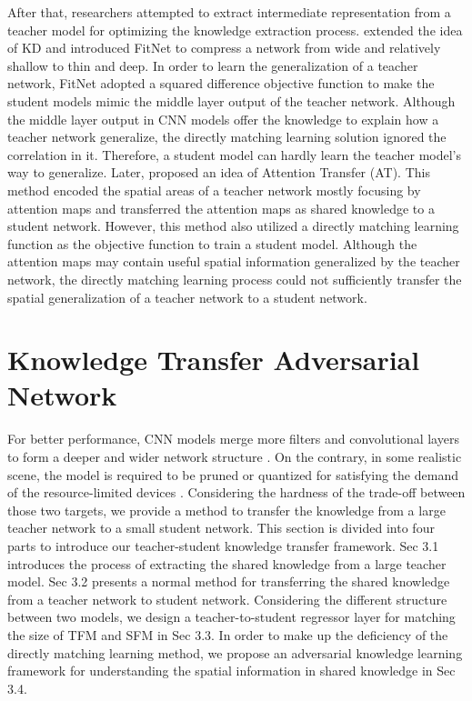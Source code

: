 \documentclass[letterpaper]{article} %
\begin{document}
After that, researchers attempted to extract intermediate representation from a teacher model for optimizing the knowledge extraction process. \cite{romero2014fitnets} extended the idea of KD and introduced FitNet to compress a network from wide and relatively shallow to thin and deep. In order to learn the generalization of a teacher network, FitNet adopted a squared difference objective function to make the student models mimic the middle layer output of the teacher network. Although the middle layer output in CNN models offer the knowledge to explain how a teacher network generalize, the directly matching learning solution ignored the correlation in it. Therefore, a student model can hardly learn the teacher model’s way to generalize. Later, \cite{zagoruyko2016paying} proposed an idea of Attention Transfer (AT). This method encoded the spatial areas of a teacher network mostly focusing by attention maps and transferred the attention maps as shared knowledge to a student network. However, this method also utilized a directly matching learning function as the objective function to train a student model. Although the attention maps may contain useful spatial information generalized by the teacher network, the directly matching learning process could not sufficiently transfer the spatial generalization of a teacher network to a student network.

\section{Knowledge Transfer Adversarial Network}

For better performance, CNN models merge more filters and convolutional layers to form a deeper and wider network structure \cite{he2016deep}. On the contrary, in some realistic scene, the model is required to be pruned or quantized for satisfying the demand of the resource-limited devices \cite{howard2017mobilenets}. Considering the hardness of the trade-off between those two targets, we provide a method to transfer the knowledge from a large teacher network to a small student network. This section is divided into four parts to introduce our teacher-student knowledge transfer framework. Sec 3.1 introduces the process of extracting the shared knowledge from a large teacher model. Sec 3.2 presents a normal method for transferring the shared knowledge from a teacher network to student network. Considering the different structure between two models, we design a teacher-to-student regressor layer for matching the size of TFM and SFM in Sec 3.3. In order to make up the deficiency of the directly matching learning method, we propose an adversarial knowledge learning framework for understanding the spatial information in shared knowledge in Sec 3.4.
\end{document}
